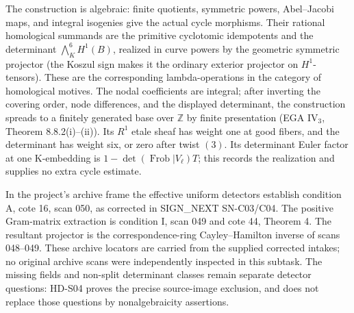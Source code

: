 The construction is algebraic: finite quotients, symmetric powers,
Abel--Jacobi maps, and integral isogenies give the actual cycle
morphisms. Their rational homological summands are the primitive
cyclotomic idempotents and the determinant
\(\bigwedge_K^6H^1(B)\), realized in curve powers by the geometric
symmetric projector (the Koszul sign makes it the ordinary exterior
projector on \(H^1\)-tensors). These are the corresponding
lambda-operations in the category of homological motives.
The nodal coefficients are integral; after inverting the covering order,
node differences, and the displayed determinant, the construction spreads
to a finitely generated base over \(\mathbb Z\) by finite presentation
(EGA IV$_3$, Theorem 8.8.2(i)--(ii)).
Its \(R^1\) etale sheaf has weight one at good fibers, and the
determinant has weight six, or zero after twist \((3)\).
Its determinant Euler factor at one K-embedding is
\(1-\det(\operatorname{Frob}|V_\ell)T\);
this records the realization and supplies no extra cycle estimate.

In the project's archive frame the effective uniform detectors establish
condition A, cote 16, scan 050, as corrected in SIGN\_NEXT SN-C03/C04.
The positive Gram-matrix extraction is condition I, scan 049 and
cote 44, Theorem 4. The resultant projector is the correspondence-ring
Cayley--Hamilton inverse of scans 048--049.
These archive locators are carried from the supplied corrected intakes;
no original archive scans were independently inspected in this subtask.
The missing fields and non-split determinant classes remain separate
detector questions: HD-S04 proves the precise source-image exclusion,
and does not replace those questions by nonalgebraicity assertions.

